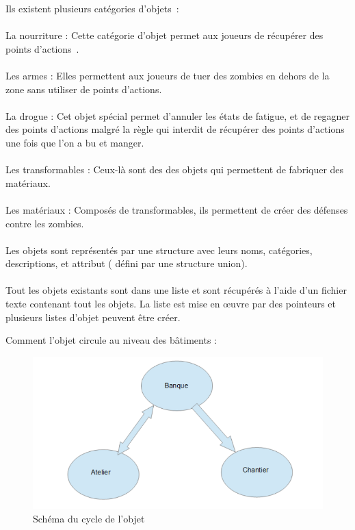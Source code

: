 \documentclass[a4paper,11pt]{article}
\begin{document}
Ils existent plusieurs catégories d'objets :
\\
\\
La nourriture : Cette catégorie d'objet permet aux joueurs de récupérer des points d'actions .
\\
\\
Les armes : Elles permettent aux joueurs de tuer des zombies en dehors de la zone sans utiliser de points d'actions.
\\
\\
La drogue : Cet objet spécial permet d'annuler les états de fatigue, et de regagner des points d'actions malgré la règle qui interdit de récupérer des points d'actions une fois que l'on a bu et manger.
\\
\\
Les transformables : Ceux-là sont des des objets qui permettent de fabriquer des matériaux.
\\
\\
Les matériaux : Composés de transformables, ils permettent de créer des défenses contre les zombies.
\\
\\
Les objets sont représentés par une structure avec leurs noms, catégories, descriptions, et attribut ( défini par une structure union).
\\
\\
Tout les objets existants sont dans une liste et sont récupérés à l'aide d'un fichier texte contenant tout les objets. La liste est mise en œuvre par des pointeurs et plusieurs listes d'objet peuvent être créer.

\newpage

Comment l'objet circule au niveau des bâtiments :
\begin{figure}[h]
    \begin{center}
    \includegraphics[width=\textwidth] {objet.PNG}
    \caption{Schéma du cycle de l'objet}
    \label{objet}
    \end{center}
\end{figure}
\end{document}
